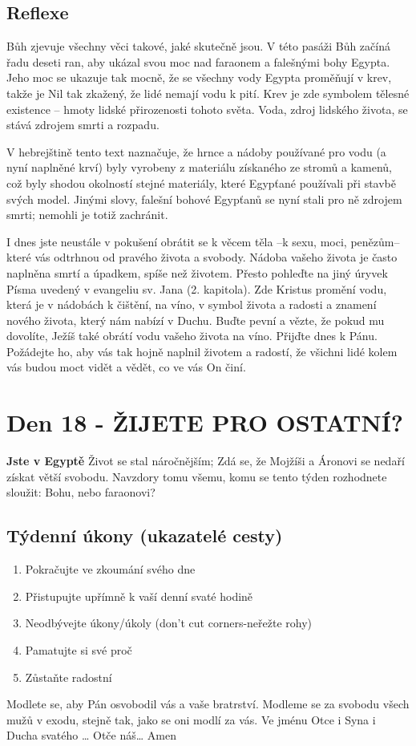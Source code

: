 \documentclass[11pt]{article}
\newcommand{\zacatekTretiTyden}{
  \textbf{Jste v Egyptě} \newline
  Život se stal náročnějším; Zdá se, že Mojžíši a Áronovi se nedaří získat větší svobodu. Navzdory tomu všemu,
komu se tento týden rozhodnete sloužit: Bohu, nebo faraonovi?

\subsection*{Týdenní úkony (ukazatelé cesty)}
\begin{enumerate}
  \item Pokračujte ve zkoumání svého dne
  \item Přistupujte upřímně k vaší denní svaté hodině
  \item Neodbývejte úkony/úkoly (don’t cut corners-neřežte rohy)
  \item Pamatujte si své proč
  \item Zůstaňte radostní
\end{enumerate}
Modlete se, aby Pán osvobodil vás a vaše bratrství. \newline
Modleme se za svobodu všech mužů v exodu, stejně tak, jako se oni modlí za vás.\newline
Ve jménu Otce i Syna i Ducha svatého …  Otče náš… Amen
}
\begin{document}
\subsection*{Reflexe}

Bůh zjevuje všechny věci takové, jaké skutečně jsou. V této pasáži Bůh začíná řadu deseti ran, aby ukázal svou
moc nad faraonem a falešnými bohy Egypta. Jeho moc se ukazuje tak mocně, že se všechny vody Egypta
proměňují v krev, takže je Nil tak zkažený, že lidé nemají vodu k pití. Krev je zde symbolem tělesné existence –
hmoty lidské přirozenosti tohoto světa. Voda, zdroj lidského života, se stává zdrojem smrti a rozpadu.

V hebrejštině tento text naznačuje, že hrnce a nádoby používané pro vodu (a nyní naplněné krví) byly vyrobeny z
materiálu získaného ze stromů a kamenů, což byly shodou okolností stejné materiály, které Egypťané používali při
stavbě svých model. Jinými slovy, falešní bohové Egypťanů se nyní stali pro ně zdrojem smrti; nemohli je totiž
zachránit.

I dnes jste neustále v pokušení obrátit se k věcem těla –k sexu, moci, penězům– které vás odtrhnou od pravého
života a svobody. Nádoba vašeho života je často naplněna smrtí a úpadkem, spíše než životem. Přesto pohleďte na
jiný úryvek Písma uvedený v evangeliu sv. Jana (2. kapitola). Zde Kristus promění vodu, která je v nádobách k
čištění, na víno, v symbol života a radosti a znamení nového života, který nám nabízí v Duchu. Buďte pevní a
vězte, že pokud mu dovolíte, Ježíš také obrátí vodu vašeho života na víno. Přijďte dnes k Pánu. Požádejte ho, aby
vás tak hojně naplnil životem a radostí, že všichni lidé kolem vás budou moct vidět a vědět, co ve vás On činí.

\newpage
\section{Den 18 - ŽIJETE PRO OSTATNÍ?}
\zacatekTretiTyden
\end{document}
